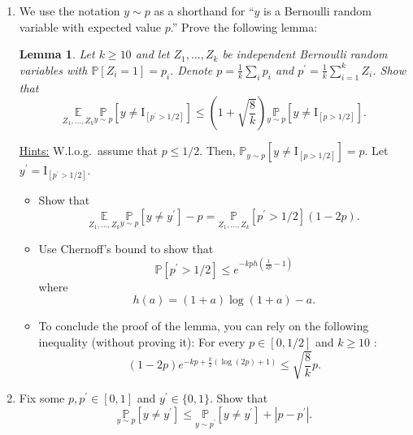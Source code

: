 \documentclass[12pt,letterpaper]{article}
\newtheorem{lemma}{Lemma}
\theoremstyle{definition}
\begin{document}
\begin{enumerate}[label=(\alph*)]
    \item  We use the notation $y \sim p$ as a shorthand for ``$y$ is a Bernoulli random variable with expected value $p$.'' Prove the following lemma:
    \begin{lemma}\label{lem2}
    Let $k \geq 10$ and let $Z_{1}, \ldots, Z_{k}$ be independent Bernoulli random variables with $\mathbb{P}\left[Z_{i}=1\right]=p_{i} .$ Denote $p=\frac{1}{k} \sum_{i} p_{i}$ and $p^{\prime}=\frac{1}{k} \sum_{i=1}^{k} Z_{i}$. Show that
$$
\underset{Z_{1}, \ldots, Z_{k}}{\mathbb{E}} \underset{y \sim p}{\mathbb{P}}\left[y \neq \mathrm I_{\left[p^{\prime}>1 / 2\right]}\right] \leq\left(1+\sqrt{\frac{8}{k}}\right) \underset{y \sim p}{\mathbb{P}}\left[y \neq \mathrm{I}_{[p>1 / 2]}\right] .
$$
    \end{lemma}
    \underline{Hints:}
W.l.o.g.~assume that $p \leq 1 / 2$. Then, $\mathbb{P}_{y \sim p}\left[y \neq \mathrm{I}_{[p>1 / 2]}\right]=p$. Let $y^{\prime}=\mathrm{I}_{\left[p^{\prime}>1 / 2\right]}$.
\begin{itemize}
    \item Show that
$$
\underset{Z_{1}, \ldots, Z_{k}}{\mathbb{E}} \underset{y \sim p}{\mathbb{P}}\left[y \neq y^{\prime}\right]-p=\underset{Z_{1}, \ldots, Z_{k}}{\mathbb{P}}\left[p^{\prime}>1 / 2\right](1-2 p) .
$$
    
    \item Use Chernoff's bound to show that
$$
\mathbb{P}\left[p^{\prime}>1 / 2\right] \leq e^{-k p h\left(\frac{1}{2 p}-1\right)}
$$
where
$$
h(a)=(1+a) \log (1+a)-a .
$$
       \item To conclude the proof of the lemma, you can rely on the following inequality (without proving it): For every $p \in[0,1 / 2]$ and $k \geq 10$ :
$$
(1-2 p) e^{-k p+\frac{k}{2}(\log (2 p)+1)} \leq \sqrt{\frac{8}{k}} p .
$$

\end{itemize}

\item  Fix some $p, p^{\prime} \in[0,1]$ and $y^{\prime} \in\{0,1\}$. Show that
$$
\underset{y \sim p}{\mathbb{P}}\left[y \neq y^{\prime}\right] \leq \underset{y \sim p^{\prime}}{\mathbb{P}}\left[y \neq y^{\prime}\right]+\left|p-p^{\prime}\right| .
$$


\end{enumerate}
\end{document}
